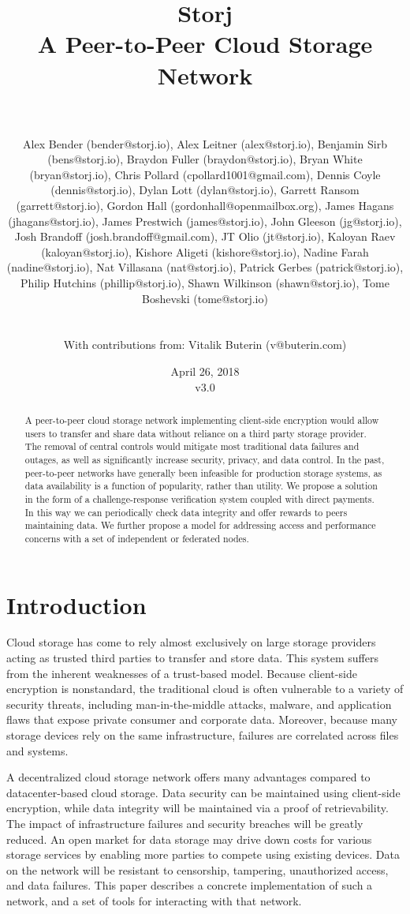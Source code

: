 \documentclass[a4paper,10pt]{article}
\title{\textbf{Storj\\A Peer-to-Peer Cloud Storage Network}}
\author{\\
\parbox{\linewidth}{\centering\small
Alex Bender (bender@storj.io),
Alex Leitner (alex@storj.io),
Benjamin Sirb (bens@storj.io),
Braydon Fuller (braydon@storj.io),
Bryan White (bryan@storj.io),
Chris Pollard (cpollard1001@gmail.com),
Dennis Coyle (dennis@storj.io),
Dylan Lott (dylan@storj.io),
Garrett Ransom (garrett@storj.io),
Gordon Hall (gordonhall@openmailbox.org),
James Hagans (jhagans@storj.io),
James Prestwich (james@storj.io),
John Gleeson (jg@storj.io),
Josh Brandoff (josh.brandoff@gmail.com),
JT Olio (jt@storj.io),
Kaloyan Raev (kaloyan@storj.io),
Kishore Aligeti (kishore@storj.io),
Nadine Farah (nadine@storj.io),
Nat Villasana (nat@storj.io),
Patrick Gerbes (patrick@storj.io),
Philip Hutchins (phillip@storj.io),
Shawn Wilkinson (shawn@storj.io),
Tome Boshevski (tome@storj.io)}\\
\\
\small With contributions from: Vitalik Buterin (v@buterin.com)
}
\date {April 26, 2018 \\ v3.0}
\begin{document}
\maketitle

\begin{abstract}
A peer-to-peer cloud storage network implementing client-side encryption would
allow users to transfer and share data without reliance on a third party storage
provider. The removal of central controls would mitigate most traditional data
failures and outages, as well as significantly increase security, privacy, and
data control. In the past, peer-to-peer networks have generally been infeasible
for production storage systems, as data availability is a function of
popularity, rather than utility. We propose a solution in the form of a
challenge-response verification system coupled with direct payments. In this
way we can periodically check data integrity and offer rewards to peers
maintaining data. We further propose a model for addressing access and
performance concerns with a set of independent or federated nodes.
\end{abstract}

\section{Introduction}

Cloud storage has come to rely almost exclusively on large storage providers
acting as trusted third parties to transfer and store data. This system suffers
from the inherent weaknesses of a trust-based model. Because client-side
encryption is nonstandard, the traditional cloud is often vulnerable to a
variety of security threats, including man-in-the-middle attacks, malware, and
application flaws that expose private consumer and corporate data. Moreover,
because many storage devices rely on the same infrastructure, failures are
correlated across files and systems.

A decentralized cloud storage network offers many advantages compared to
datacenter-based cloud storage. Data security can be maintained using
client-side encryption, while data integrity will be maintained via a proof of
retrievability. The impact of infrastructure failures and security breaches will
be greatly reduced. An open market for data storage may drive down costs for
various storage services by enabling more parties to compete using existing
devices. Data on the network will be resistant to censorship, tampering,
unauthorized access, and data failures. This paper describes a concrete
implementation of such a network, and a set of tools for interacting with that
network.
\end{document}
